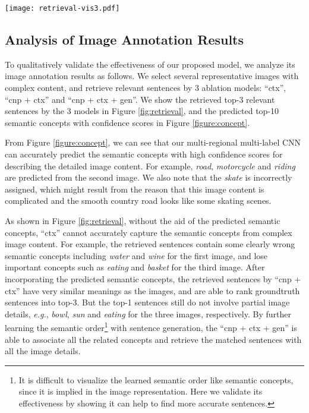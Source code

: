 \documentclass[10pt,twocolumn,letterpaper]{article}
\begin{document}
\begin{figure*}[t]
\centering
\texttt{[image: retrieval-vis3.pdf]}
\caption{Results of image annotation by 3 ablation models.
Groundtruth matched sentences are marked as red and bold, while some sentences sharing similar meanings as groundtruths are marked as underline (best viewed in colors).}
\label{fig:retrieval}
\end{figure*}





\subsection{Analysis of Image Annotation Results}

To qualitatively validate the effectiveness of our proposed model,
we analyze its image annotation results as follows.
We select several representative images with complex content,
and retrieve relevant sentences by 3 ablation models:
``ctx'', ``cnp + ctx'' and ``cnp + ctx + gen''.
We show the retrieved top-3 relevant sentences by the 3 models in Figure \ref{fig:retrieval},
and the predicted top-10 semantic concepts with confidence scores in Figure \ref{figure:concept}.

From Figure \ref{figure:concept}, we can see that our multi-regional multi-label CNN
can accurately predict the semantic concepts with high confidence scores
for describing the detailed image content. For example,
\emph{road}, \emph{motorcycle} and \emph{riding} are predicted from the second image.
We also note that the \emph{skate} is incorrectly assigned, which might result from the
reason that this image content is complicated and
the smooth country road looks like some skating scenes.

As shown in Figure \ref{fig:retrieval}, without the aid of the predicted semantic concepts,
``ctx'' cannot accurately capture the semantic concepts from complex image content.
For example, the retrieved sentences contain some clearly wrong semantic concepts
including \emph{water} and \emph{wine} for the first image,
and lose important concepts such as \emph{eating} and \emph{basket} for the third image.
After incorporating the predicted semantic concepts,
the retrieved sentences by ``cnp + ctx''
have very similar meanings as the images,
and are able to rank groundtruth sentences into top-3.
But the top-1 sentences still do not involve partial image details,
\emph{e.g.}, \emph{bowl}, \emph{sun} and \emph{eating} for the three images, respectively.
By further learning the semantic order\footnote{It is difficult to visualize the learned semantic order
like semantic concepts, since it is implied in the image representation.
Here we validate its effectiveness by showing it can help to find more accurate sentences.}
 with sentence generation,
the ``cnp + ctx + gen'' is able to associate all the related concepts
and retrieve the matched sentences with all the image details.
\end{document}
